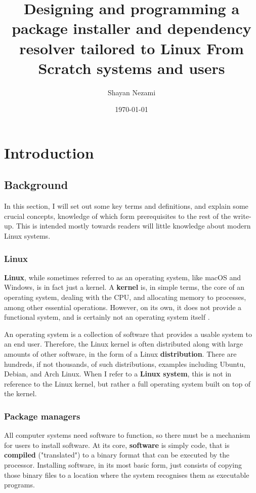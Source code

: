 \documentclass[10pt]{article}
\title{Designing and programming a package installer and dependency resolver tailored to Linux From Scratch systems and users}
\author{Shayan Nezami}
\date{\today}
\begin{document}
\maketitle
\tableofcontents
\pagebreak

\section{Introduction}

\subsection{Background}

In this section, I will set out some key terms and definitions, and explain some crucial concepts, knowledge of which form prerequisites to the rest of the write-up. This is intended mostly towards readers will little knowledge about modern Linux systems.

\subsubsection{Linux}

\textbf{Linux}, while sometimes referred to as an operating system, like macOS and Windows, is in fact just a kernel. A \textbf{kernel} is, in simple terms, the core of an operating system, dealing with the CPU, and allocating memory to processes, among other essential operations. However, on its own, it does not provide a functional system, and is certainly not an operating system itself \cite{LinuxAndGnu}.

An operating system is a collection of software that provides a usable system to an end user. Therefore, the Linux kernel is often distributed along with large amounts of other software, in the form of a Linux \textbf{distribution}. There are hundreds, if not thousands, of such distributions, examples including Ubuntu, Debian, and Arch Linux. When I refer to a \textbf{Linux system}, this is not in reference to the Linux kernel, but rather a full operating system built on top of the kernel.

\subsubsection{Package managers} \label{PackageManagerS}

All computer systems need software to function, so there must be a mechanism for users to install software. At its core, \textbf{software} is simply code, that is \textbf{compiled} ("translated") to a binary format that can be executed by the processor. Installing software, in its most basic form, just consists of copying those binary files to a location where the system recognises them as executable programs.
\end{document}
